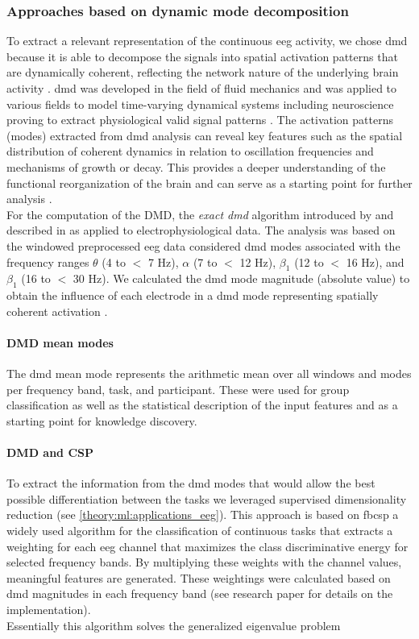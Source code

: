 \subsubsection{Approaches based on dynamic mode decomposition}
To extract a relevant representation of the continuous \gls{eeg} activity, we chose \gls{dmd} because it is able to decompose the signals into spatial activation patterns that are dynamically coherent, reflecting the network nature of the underlying brain activity \cite{Brunton2016}. \Gls{dmd} was developed in the field of fluid mechanics and was applied to various fields to model time-varying dynamical systems including neuroscience proving to extract physiological valid signal patterns \cite{Brunton2016, Kunert-Graf2019}. The activation patterns (modes) extracted from \gls{dmd} analysis can reveal key features such as the spatial distribution of coherent dynamics in relation to oscillation frequencies and mechanisms of growth or decay. This provides a deeper understanding of the functional reorganization of the brain and can serve as a starting point for further analysis \cite{Brunton2016}.\\
For the computation of the DMD, the \textit{exact \gls{dmd}} algorithm introduced by \citeauthor{Tu2014} \cite{Tu2014} and described in \cite{Brunton2016} as applied to electrophysiological data. The analysis was based on the windowed preprocessed \gls{eeg} data considered \gls{dmd} modes associated with the frequency ranges $\theta$ (4 to $<$ 7 Hz), $\alpha$ (7 to $<$ 12 Hz), $\beta_1$ (12 to $<$ 16 Hz), and $\beta_1$ (16 to $<$ 30 Hz). We calculated the \gls{dmd} mode magnitude (absolute value) to obtain the influence of each electrode in a \gls{dmd} mode representing spatially coherent activation \cite{Brunton2016}.

\paragraph{DMD mean modes}
The \gls{dmd} mean mode represents the arithmetic mean over all windows and modes per frequency band, task, and participant. These were used for group classification as well as the statistical description of the input features and as a starting point for knowledge discovery.

\paragraph{DMD and CSP}
To extract the information from the \gls{dmd} modes that would allow the best possible differentiation between the tasks we leveraged supervised dimensionality reduction (see \autoref{theory:ml:applications_eeg}). This approach is based on \gls{fbcsp} a widely used algorithm for the classification of continuous tasks that extracts a weighting for each \gls{eeg} channel that maximizes the class discriminative energy for selected frequency bands. By multiplying these weights with the channel values, meaningful features are generated. These weightings were calculated based on \gls{dmd} magnitudes in each frequency band (see research paper  \cite{Goelz2021a} for details on the implementation).\\
Essentially this algorithm solves the generalized eigenvalue problem 

